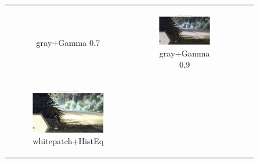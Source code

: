 \documentclass[11pt, a4]{article}
\begin{document}
\begin{enumerate}
\begin{enumerate}
\begin{figure}[h]
{\begin{tabular}{cccc}
\begin{subfigure}[h]{0.45\linewidth}
							\caption{gray+Gamma 0.7}
							\label{fig:RawImage3_tone_3}
						\end{subfigure} &
						\begin{subfigure}[h]{0.45\linewidth}
							\centering
							\includegraphics[width=\linewidth]{../output/RawImage3_Tone_gray_Gamma0.9.pdf}
							\caption{gray+Gamma 0.9}
							\label{fig:RawImage3_tone_4}
						\end{subfigure}\\
						\begin{subfigure}[h]{0.45\linewidth}
							\centering
							\includegraphics[width=\linewidth]{../output/RawImage3_Tone_whitepatch_HistEq.pdf}
							\caption{whitepatch+HistEq}
							\label{fig:RawImage3_tone_5}
						\end{subfigure} &
						\begin{subfigure}[h]{0.45\linewidth}
							\centering

\end{subfigure}
\end{tabular}}
\end{figure}
\end{enumerate}
\end{enumerate}
\end{document}
